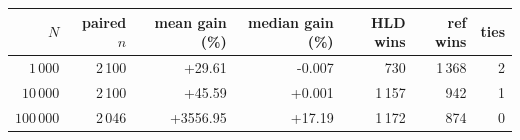 \begin{tabular}{rrrrrrr}
\hline
$N$ & paired $n$ & mean gain (\%) & median gain (\%) & HLD wins & ref wins & ties \\
\hline
$1\,000$ & 2\,100 & +29.61 & -0.007 & 730 & 1\,368 & 2 \\
$10\,000$ & 2\,100 & +45.59 & +0.001 & 1\,157 & 942 & 1 \\
$100\,000$ & 2\,046 & +3556.95 & +17.19 & 1\,172 & 874 & 0 \\
\hline
\end{tabular}

